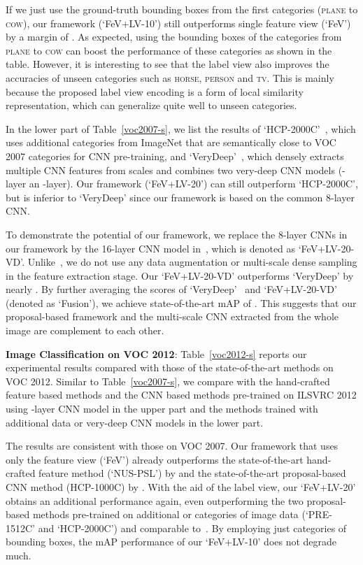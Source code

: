 \documentclass[10pt,twocolumn,letterpaper]{article}
\begin{document}
If we just use the ground-truth bounding boxes from the first 
categories (\textsc{plane} to \textsc{cow}), our framework
(`FeV+LV-10') still outperforms single feature view (`FeV') by a
margin of . As expected, using the bounding boxes of the
categories from \textsc{plane} to \textsc{cow} can boost the
performance of these categories as shown in the table. However, it
is interesting to see that the label view also improves the
accuracies of unseen categories such as \textsc{horse},
\textsc{person} and \textsc{tv}. This is mainly because the
proposed label view encoding is a form of local similarity
representation, which can generalize quite well to unseen
categories.

In the lower part of Table~\ref{voc2007-s}, we list the results of
`HCP-2000C'~\cite{Wei2014}, which uses additional 
categories from ImageNet that are semantically close to VOC 2007
categories for CNN pre-training, and
`VeryDeep'~\cite{Simonyan2014}, which densely extracts multiple
CNN features from  scales and combines two very-deep CNN models
(-layer an -layer). Our framework (`FeV+LV-20') can still
outperform `HCP-2000C', but is inferior to `VeryDeep' since our
framework is based on the common 8-layer CNN.

To demonstrate the potential of our framework, we replace the
8-layer CNNs in our framework by the 16-layer CNN model
in~\cite{Simonyan2014}, which is denoted as `FeV+LV-20-VD'.
Unlike~\cite{Simonyan2014}, we do not use any data augmentation or
multi-scale dense sampling in the feature extraction stage. Our
`FeV+LV-20-VD' outperforms `VeryDeep' by nearly . By further
averaging the scores of `VeryDeep'~\cite{Simonyan2014} and
`FeV+LV-20-VD' (denoted as `Fusion'), we achieve state-of-the-art
mAP of . This suggests that our proposal-based framework
and the multi-scale CNN extracted from the whole image are
complement to each other.



\textbf{Image Classification on VOC 2012}: Table~\ref{voc2012-s}
reports our experimental results compared with those of the
state-of-the-art methods on VOC 2012. Similar to
Table~\ref{voc2007-s}, we compare with the hand-crafted feature
based methods and the CNN based methods pre-trained on ILSVRC 2012
using -layer CNN model in the upper part and the methods
trained with additional data or very-deep CNN models in the lower
part.

The results are consistent with those on VOC 2007. Our framework
that uses only the feature view (`FeV') already outperforms the
state-of-the-art hand-crafted feature method (`NUS-PSL') by
 and the state-of-the-art proposal-based CNN method
(HCP-1000C) by . With the aid of the label view, our
`FeV+LV-20' obtains an additional  performance again, even
outperforming the two proposal-based methods pre-trained on
additional  or  categories of image data (`PRE-1512C'
and `HCP-2000C') and comparable to~\cite{Oquab2014}. By employing
just  categories of bounding boxes, the mAP performance of our
`FeV+LV-10' does not degrade much.
\end{document}
